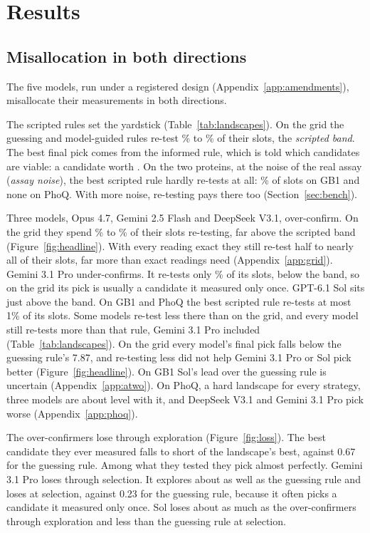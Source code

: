 \section{Results}
\label{sec:res}

\subsection{Misallocation in both directions}
\label{sec:both}

The five models, run under a registered design (Appendix~\ref{app:amendments}), misallocate their measurements in both directions.

The scripted rules set the yardstick (Table~\ref{tab:landscapes}). On the grid the guessing and model-guided rules
re-test \nGuessShare\% to \nBandHi\% of their slots, the \emph{scripted band}. The best final pick comes from the
informed rule, which is told which candidates are viable: a candidate worth \nInformedPick. On the two proteins, at the noise of the real assay (\emph{assay noise}), the
best scripted rule hardly re-tests at all: \nGbBestShare\% of slots on GB1 and none on PhoQ. With more noise,
re-testing pays there too (Section~\ref{sec:bench}).

Three models, Opus 4.7, Gemini 2.5 Flash and DeepSeek V3.1, over-confirm. On the grid they spend
\nShareOpusint\% to \nShareFlashint\% of their slots re-testing, far above the scripted band (Figure~\ref{fig:headline}). With every reading exact they still re-test half to nearly all of their slots, far more than exact readings
need (Appendix~\ref{app:grid}). Gemini 3.1 Pro under-confirms. It re-tests only \nShareProint\% of its slots, below the
band, so on the grid its pick is usually a candidate it measured only once. GPT-6.1 Sol sits just above the band.
On GB1 and PhoQ the best scripted rule re-tests at most 1\% of its slots. Some models re-test less there than on the grid, and every model still re-tests more than that rule, Gemini 3.1 Pro included (Table~\ref{tab:landscapes}). On the grid every model's final pick falls below the guessing rule's 7.87, and re-testing less did
not help Gemini 3.1 Pro or Sol pick better (Figure~\ref{fig:headline}). On GB1 Sol's lead over the guessing rule is uncertain (Appendix~\ref{app:atwo}). On PhoQ, a hard landscape for every strategy, three models are about level with it, and DeepSeek V3.1 and Gemini 3.1 Pro pick worse (Appendix~\ref{app:phoq}).




The over-confirmers lose through exploration (Figure~\ref{fig:loss}). The best candidate they ever measured falls \nExplDeep{} to \nExplFlash{} short of the landscape's best, against 0.67 for the guessing rule. Among what they tested they pick almost perfectly. Gemini 3.1 Pro loses through selection. It explores about as well as the guessing rule and loses \nSelPro{} at
selection, against 0.23 for the guessing rule, because it often picks a candidate it measured only once. Sol loses about as much as the over-confirmers through exploration and less than the
guessing rule at selection.

